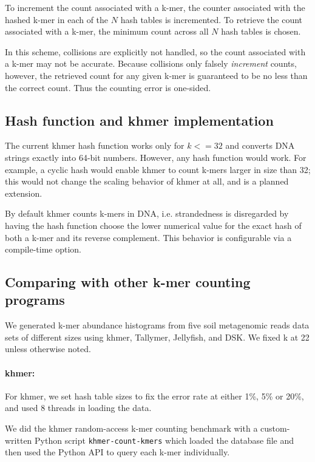 \documentclass{article}
\begin{document}
To increment the count associated with a k-mer, the counter associated
with the hashed k-mer in each of the $N$ hash tables is incremented.
To retrieve the count associated with a k-mer, the minimum count
across all $N$ hash tables is chosen.

In this scheme, collisions are explicitly not handled, so the count
associated with a k-mer may not be accurate. Because collisions only
falsely {\em increment} counts, however, the retrieved count for any
given k-mer is guaranteed to be no less than the correct count.  Thus
the counting error is one-sided.

\subsection{Hash function and khmer implementation}

The current khmer hash function works only for $k <= 32$ and converts
DNA strings exactly into 64-bit numbers.  However, any hash function
would work. For example, a cyclic hash would enable khmer to count
k-mers larger in size than 32; this would not change the scaling
behavior of khmer at all, and is a planned extension.

By default khmer counts k-mers in DNA, i.e. strandedness is
disregarded by having the hash function choose the lower numerical
value for the exact hash of both a k-mer and its reverse complement.
This behavior is configurable via a compile-time option.

\subsection{Comparing with other k-mer counting programs}

We generated k-mer abundance histograms from five soil metagenomic reads
data sets of different sizes using khmer, Tallymer, Jellyfish, and DSK.
We fixed k at 22 unless otherwise noted.

\paragraph{khmer:}
For khmer, we set hash table sizes to fix the error rate at
either 1\%, 5\% or 20\%, and used 8 threads in loading the data.

We did the khmer random-access k-mer counting benchmark with a
custom-written Python script {\tt khmer-count-kmers} which loaded the
database file and then used the Python API to query each k-mer
individually.
\end{document}
